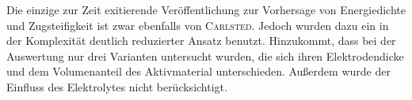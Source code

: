 Die einzige zur Zeit exitierende Veröffentlichung zur Vorhersage von Energiedichte und Zugsteifigkeit ist zwar ebenfalls von \textsc{Carlsted}\cite{Carlstedt2018}. Jedoch wurden dazu ein in der Komplexität deutlich reduzierter Ansatz benutzt. Hinzukommt, dass bei der Auswertung nur drei Varianten untersucht wurden, die sich ihren Elektrodendicke und dem Volumenanteil des Aktivmaterial unterschieden. Außerdem wurde der Einfluss des Elektrolytes nicht berücksichtigt.











   


